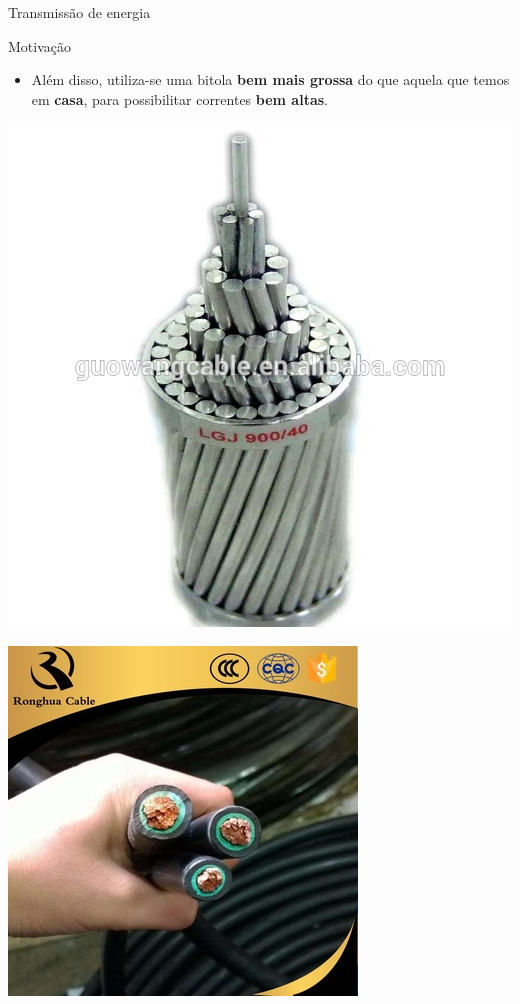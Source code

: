 \begin{frame}{Transmissão de energia}
	\begin{block}{Motivação}
		\begin{itemize}
			\item Além disso, utiliza-se uma bitola \textbf{bem mais grossa} do que aquela que temos em \textbf{casa}, para possibilitar correntes \textbf{bem altas}.
		\end{itemize}
	\end{block}

	\begin{minipage}{0.49\linewidth}
		\centering
		\includegraphics[width=\linewidth]{Figuras/Ch03/fig10}
	\end{minipage}
	\hfill
	\begin{minipage}{0.49\linewidth}
		\centering
		\includegraphics[width=\linewidth]{Figuras/Ch03/fig11}

\end{minipage}
\end{frame}
